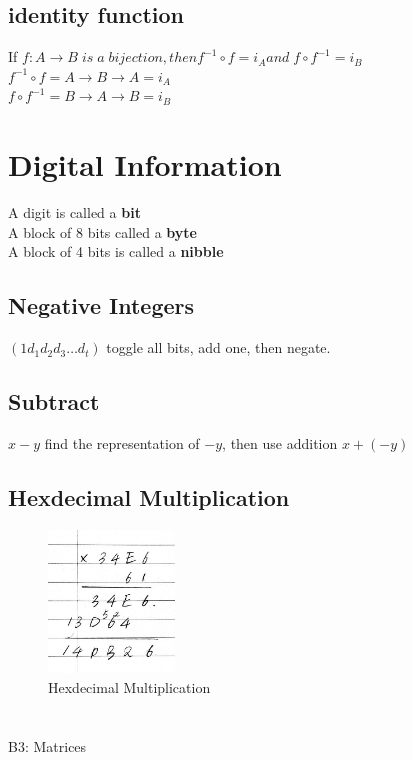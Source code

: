 \documentclass{article}
\begin{document}
\begin{spacing}{1.5}
\subsection{identity function}

If $f:A \rightarrow  B\; is\; a \;bijection, then f^{-1} \circ f = i_A and \;
f \circ f^{-1} = i_B$\\
$f^{-1} \circ f = A \rightarrow B \rightarrow A = i_A$\\
$f \circ f^{-1} = B \rightarrow A \rightarrow B = i_B$


\section{Digital Information}
A digit is called a \textbf{bit}\\
A block of 8 bits called a \textbf{byte}\\
A block of 4 bits is called a \textbf{nibble}
\subsection{Negative Integers}
$(1 d_ 1 d_2 d_3 \dots d_t)$ toggle all bits, add one, then negate.
\subsection{Subtract}
$x-y$ find the representation of $-y$, then use addition $x + (-y)$
\subsection{Hexdecimal Multiplication}
\begin{figure}[htb]
\centering 
\includegraphics[width=0.3\textwidth]{hexmul.jpg} %
\caption{Hexdecimal Multiplication} 
\end{figure}

\section{}{B3: Matrices}

\end{spacing}
\end{document}

